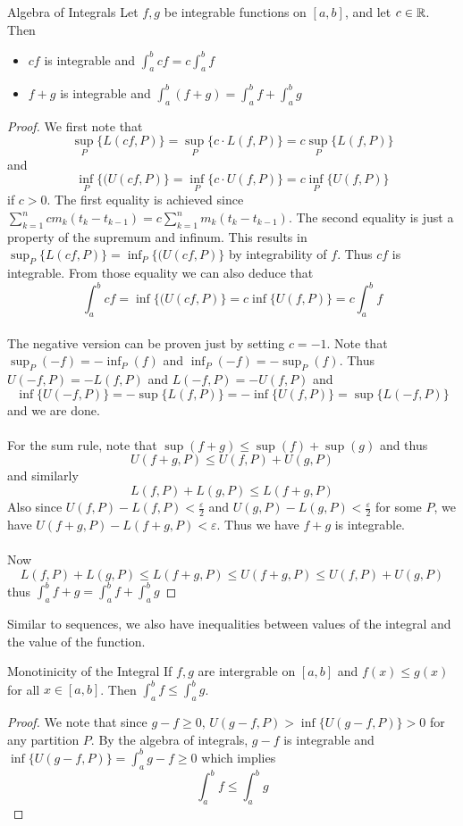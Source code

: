 \documentclass[a4paper]{article}
\begin{document}
\begin{thm}{Algebra of Integrals}{} Let $f,g$ be integrable functions on $[a,b]$, and let $c\in\mathbb{R}$. Then
\begin{itemize}
\item $cf$ is integrable and $\int_{a}^{b}cf=c\int_{a}^{b}f$
\item $f+g$ is integrable and $\int_{a}^{b}(f+g)=\int_{a}^{b}f+\int_{a}^{b}g$
\end{itemize}\tcbline
\begin{proof} We first note that $$\sup_P\{L(cf,P)\}=\sup_P\{c\cdot L(f,P)\}=c\sup_P\{L(f,P)\}$$ and $$\inf_P\{(U(cf,P)\}=\inf_P\{c\cdot U(f,P)\}=c\inf_P\{U(f,P)\}$$ if $c>0$. The first equality is achieved since $\sum_{k=1}^ncm_k(t_k-t_{k-1})=c\sum_{k=1}^nm_k(t_k-t_{k-1})$. The second equality is just a property of the supremum and infinum. This results in $\sup_P\{L(cf,P)\}=\inf_P\{(U(cf,P)\}$ by integrability of $f$. Thus $cf$ is integrable. From those equality we can also deduce that $$\int_a^bcf=\inf\{(U(cf,P)\}=c\inf\{U(f,P)\}=c\int_a^bf$$
\\
The negative version can be proven just by setting $c=-1$. Note that $\sup_P(-f)=-\inf_P(f)$ and $\inf_P(-f)=-\sup_P(f)$. Thus $U(-f,P)=-L(f,P)$ and $L(-f,P)=-U(f,P)$ and $$\inf\{U(-f,P)\}=-\sup\{L(f,P)\}=-\inf\{U(f,P)\}=\sup\{L(-f,P)\}$$ and we are done. \\~\\
For the sum rule, note that $\sup(f+g)\leq\sup(f)+\sup(g)$ and thus $$U(f+g,P)\leq U(f,P)+U(g,P)$$ and similarly $$L(f,P)+L(g,P)\leq L(f+g,P)$$ Also since $U(f,P)-L(f,P)<\frac{\varepsilon}{2}$ and $U(g,P)-L(g,P)<\frac{\varepsilon}{2}$ for some $P$, we have $U(f+g,P)-L(f+g,P)<\varepsilon$. Thus we have $f+g$ is integrable. \\~\\
Now $$L(f,P)+L(g,P)\leq L(f+g,P)\leq U(f+g,P)\leq U(f,P)+U(g,P)$$ thus $\int_a^bf+g=\int_a^bf+\int_a^bg$
\end{proof}
\end{thm}

Similar to sequences, we also have inequalities between values of the integral and the value of the function. 

\begin{thm}{Monotinicity of the Integral}{} If $f,g$ are intergrable on $[a,b]$ and $f(x)\leq g(x)$ for all $x\in[a,b]$. Then $\int_{a}^{b}f\leq\int_{a}^{b}g$. \tcbline
\begin{proof} We note that since $g-f\geq 0$, $U(g-f,P)>\inf\{U(g-f,P)\}>0$ for any partition $P$. By the algebra of integrals, $g-f$ is integrable and $\inf\{U(g-f,P)\}=\int_a^bg-f\geq 0$ which implies $$\int_a^bf\leq\int_a^bg$$
\end{proof}
\end{thm}
\end{document}

